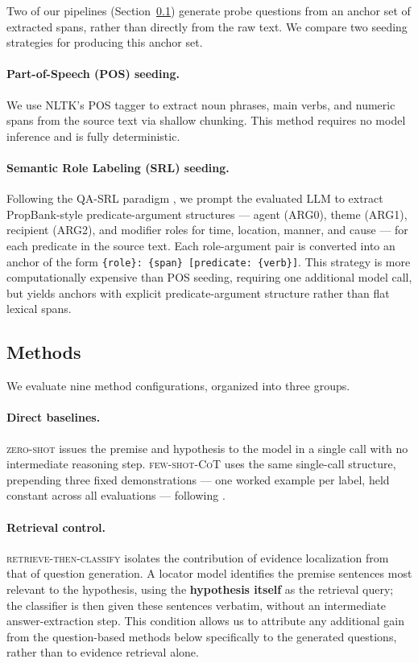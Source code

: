 Two of our pipelines (Section~\ref{sec:methods}) generate probe questions from
an anchor set of extracted spans, rather than directly from the raw text. We
compare two seeding strategies for producing this anchor set.

\paragraph{Part-of-Speech (POS) seeding.} We use NLTK's POS tagger
\citep{loper2002nltk} to extract noun phrases, main verbs, and numeric spans
from the source text via shallow chunking. This method requires no model
inference and is fully deterministic.

\paragraph{Semantic Role Labeling (SRL) seeding.} Following the QA-SRL
paradigm \citep{fitzgerald2018large,pyatkin2021asking}, we prompt the
evaluated LLM to extract PropBank-style predicate-argument structures ---
agent (ARG0), theme (ARG1), recipient (ARG2), and modifier roles for time,
location, manner, and cause --- for each predicate in the source text. Each
role-argument pair is converted into an anchor of the form
\texttt{\{role\}: \{span\} [predicate: \{verb\}]}. This strategy is more
computationally expensive than POS seeding, requiring one additional model
call, but yields anchors with explicit predicate-argument structure rather
than flat lexical spans.

\subsection{Methods}
\label{sec:methods}

We evaluate nine method configurations, organized into three groups.

\paragraph{Direct baselines.} \textsc{zero-shot} issues the premise and
hypothesis to the model in a single call with no intermediate reasoning step.
\textsc{few-shot-CoT} uses the same single-call structure, prepending three
fixed demonstrations --- one worked example per label, held constant across
all evaluations --- following \citet{wei2022chain}.

\paragraph{Retrieval control.} \textsc{retrieve-then-classify} isolates the
contribution of evidence localization from that of question generation. A
locator model identifies the premise sentences most relevant to the
hypothesis, using the \textbf{hypothesis itself} as the retrieval query; the
classifier is then given these sentences verbatim, without an intermediate
answer-extraction step. This condition allows us to attribute any additional
gain from the question-based methods below specifically to the generated
questions, rather than to evidence retrieval alone.

